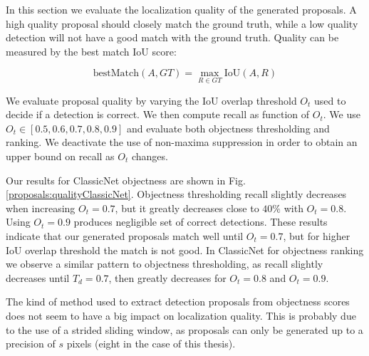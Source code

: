 In this section we evaluate the localization quality of the generated proposals. A high quality proposal should closely match the ground truth, while a low quality detection will not have a good match with the ground truth. Quality can be measured by the best match IoU score:

\begin{equation}
	\text{bestMatch}(A, GT) = \max_{R \in GT} \text{IoU}(A, R)
	\label{proposals:bestMatch}
\end{equation}

We evaluate proposal quality by varying the IoU overlap threshold $O_t$ used to decide if a detection is correct. We then compute recall as function of $O_t$. We use $O_t \in [0.5, 0.6, 0.7, 0.8, 0.9]$ and evaluate both objectness thresholding and ranking. We deactivate the use of non-maxima suppression in order to obtain an upper bound on recall as $O_t$ changes.

Our results for ClassicNet objectness are shown in Fig. \ref{proposals:qualityClassicNet}. Objectness thresholding recall slightly decreases when increasing $O_t = 0.7$, but it greatly decreases close to $40\%$ with $O_t = 0.8$. Using $O_t = 0.9$ produces negligible set of correct detections. These results indicate that our generated proposals match well until $O_t = 0.7$, but for higher IoU overlap threshold the match is not good.
In ClassicNet for objectness ranking we observe a similar pattern to objectness thresholding, as recall slightly decreases until $T_d = 0.7$, then greatly decreases for $O_t = 0.8$ and $O_t = 0.9$.

The kind of method used to extract detection proposals from objectness scores does not seem to have a big impact on localization quality. This is probably due to the use of a strided sliding window, as proposals can only be generated up to a precision of $s$ pixels (eight in the case of this thesis).

